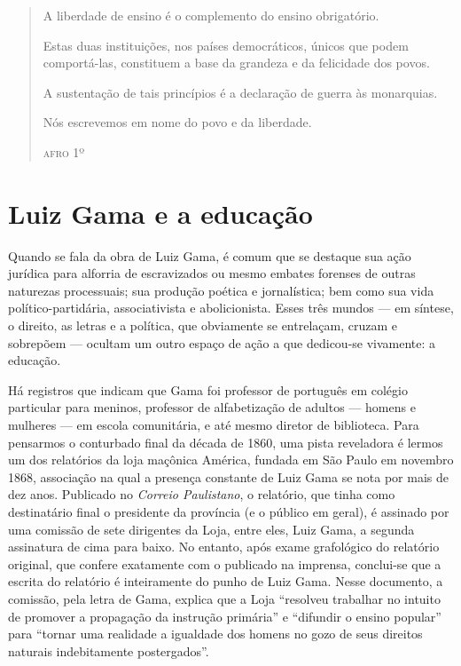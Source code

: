 \begin{quote}
A liberdade de ensino é o complemento do ensino obrigatório.

Estas duas instituições, nos países democráticos, únicos que podem
comportá-las, constituem a base da grandeza e da felicidade dos povos.

A sustentação de tais princípios é a declaração de guerra às monarquias.

Nós escrevemos em nome do povo e da liberdade.

\begin{flushright}
\textsc{afro} 1º
\end{flushright}
\end{quote}

\section{Luiz Gama e a educação}

Quando se fala da obra de Luiz Gama, é comum que se destaque sua ação
jurídica para alforria de escravizados ou mesmo embates forenses de
outras naturezas processuais; sua produção poética e jornalística; bem
como sua vida político-partidária, associativista e abolicionista. Esses
três mundos --- em síntese, o direito, as letras e a política, que
obviamente se entrelaçam, cruzam e sobrepõem --- ocultam um outro espaço
de ação a que dedicou-se vivamente: a educação.

Há registros que indicam que Gama foi professor de português em colégio
particular para meninos, professor de alfabetização de adultos --- homens
e mulheres --- em escola comunitária, e até mesmo diretor de biblioteca.
Para pensarmos o conturbado final da década de 1860, uma pista
reveladora é lermos um dos relatórios da loja maçônica América, fundada
em São Paulo em novembro 1868, associação na qual a presença constante
de Luiz Gama se nota por mais de dez anos. Publicado no \emph{Correio
Paulistano}, o relatório, que tinha como destinatário final o presidente
da província (e o público em geral), é assinado por uma comissão de sete
dirigentes da Loja, entre eles, Luiz Gama, a segunda assinatura de cima
para baixo. No entanto, após exame grafológico do relatório original,
que confere exatamente com o publicado na imprensa, conclui-se que a
escrita do relatório é inteiramente do punho de Luiz Gama. Nesse
documento, a comissão, pela letra de Gama, explica que a Loja ``resolveu
trabalhar no intuito de promover a propagação da instrução primária'' e
``difundir o ensino popular'' para ``tornar uma realidade a igualdade dos
homens no gozo de seus direitos naturais indebitamente postergados''.

